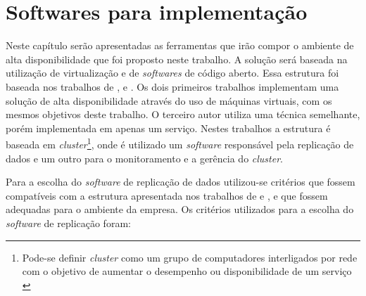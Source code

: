 \chapter{Softwares para implementação}
\label{cap:softwares}



Neste capítulo serão apresentadas as ferramentas que irão compor o ambiente de alta disponibilidade que foi proposto neste trabalho. A solução 
será baseada na utilização de virtualização e de \textit{softwares} de código aberto. Essa estrutura foi baseada nos trabalhos de 
\citet{goncalves2009}, \citet{reis2009} e \citet{zaminhani2008}. Os dois primeiros trabalhos implementam uma solução de alta disponibilidade 
através do uso de máquinas virtuais, com os mesmos objetivos deste trabalho. O terceiro autor utiliza uma técnica semelhante, porém implementada 
em apenas um serviço. Nestes trabalhos a estrutura é baseada em \textit{cluster}\footnote[1]{Pode-se definir \textit{cluster} como um grupo de 
computadores interligados por rede com o objetivo de aumentar o desempenho ou disponibilidade de um serviço \cite{freitas2005}}, onde é utilizado 
um \textit{software} responsável pela replicação de dados e um outro para o monitoramento e a gerência do \textit{cluster}. 

Para a escolha do \textit{software} de replicação de dados utilizou-se critérios que fossem compatíveis com a estrutura apresentada nos trabalhos
de \citet{goncalves2009} e \citet{reis2009}, e que fossem adequadas para o ambiente da empresa. Os critérios utilizados para a escolha do 
\textit{software} de replicação foram:

